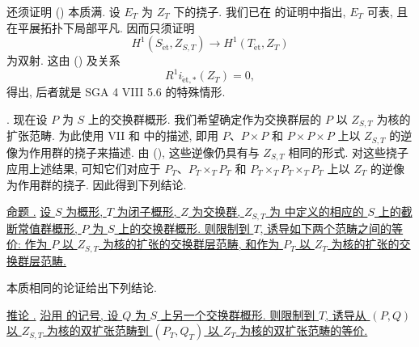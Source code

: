 还须证明 () 本质满. 设 $E_T$ 为 $Z_T$ 下的挠子. 我们已在  的证明中指出, $E_T$ 可表, 且在平展拓扑下局部平凡. 因而只须证明
\[
 H^1(S_{\mathrm{\acute{e}t}},Z_{S,T})
 \longrightarrow H^1(T_{\mathrm{\acute{e}t}},Z_T)
\]
为双射. 这由 () 及关系
\[
 R^1i_{\mathrm{\acute{e}t},*}(Z_T)=0,
\]
得出, 后者就是 SGA 4 VIII 5.6 的特殊情形.

\medskip
\noindent {}. 现在设 $P$ 为 $S$ 上的交换群概形. 我们希望确定作为交换群层的 $P$ 以 $Z_{S,T}$ 为核的扩张范畴. 为此使用 VII  和  中的描述, 即用 $P$、$P\times P$ 和 $P\times P\times P$ 上以 $Z_{S,T}$ 的逆像为作用群的挠子来描述. 由 (), 这些逆像仍具有与 $Z_{S,T}$ 相同的形式. 对这些挠子应用上述结果, 可知它们对应于 $P_T$、$P_T\times_TP_T$ 和 $P_T\times_TP_T\times_TP_T$ 上以 $Z_T$ 的逆像为作用群的挠子. 因此得到下列结论.

\medskip
\noindent\underline{命题 .} \underline{设 $S$ 为概形, $T$ 为闭子概形, $Z$ 为交换群, $Z_{S,T}$ 为  中定义的相应的 $S$ 上的截断常值群概形, $P$ 为 $S$ 上的交换群概形. 则限制到 $T$, 诱导如下两个范畴之间的等价: 作为 $P$ 以 $Z_{S,T}$ 为核的扩张的交换群层范畴, 和作为 $P_T$ 以 $Z_T$ 为核的扩张的交换群层范畴.}

本质相同的论证给出下列结论.

\medskip
\noindent\underline{推论 .} \underline{沿用  的记号, 设 $Q$ 为 $S$ 上另一个交换群概形. 则限制到 $T$, 诱导从 $(P,Q)$ 以 $Z_{S,T}$ 为核的双扩张范畴到 $(P_T,Q_T)$ 以 $Z_T$ 为核的双扩张范畴的等价.}




